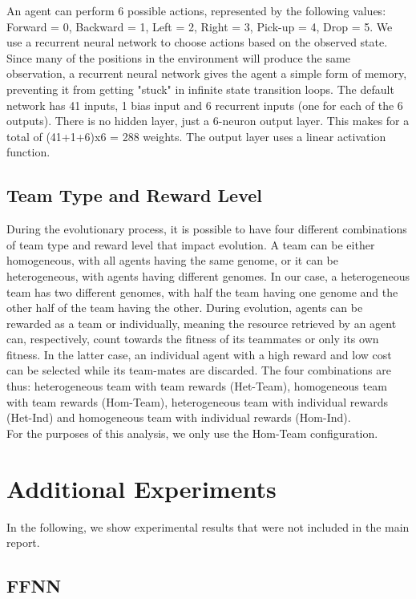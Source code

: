 \documentclass[12pt]{article}
\begin{document}
\begin{appendices}
An agent can perform 6 possible actions, represented by the following values: Forward = 0, Backward = 1, Left = 2, Right = 3, Pick-up = 4, Drop = 5.
We use a recurrent neural network to choose actions based on the observed state.
Since many of the positions in the environment will produce the same observation, a recurrent neural network gives the agent a simple form of memory, preventing it from getting "stuck" in infinite state transition loops.
The default network has 41 inputs, 1 bias input and 6 recurrent inputs (one for each of the 6 outputs). 
There is no hidden layer, just a 6-neuron output layer. 
This makes for a total of (41+1+6)x6 = 288 weights. 
The output layer uses a linear activation function.

\subsection{Team Type and Reward Level}\label{rewards}

During the evolutionary process, it is possible to have four different combinations of team type and reward level that impact evolution.
A team can be either homogeneous, with all agents having the same genome, or it can be heterogeneous, with agents having different genomes.
In our case, a heterogeneous team has two different genomes, with half the team having one genome and the other half of the team having the other.
During evolution, agents can be rewarded as a team or individually, meaning the resource retrieved by an agent can, respectively, count towards the fitness of its teammates or only its own fitness.
In the latter case, an individual agent with a high reward and low cost can be selected while its team-mates are discarded. 
The four combinations are thus: heterogeneous team with team rewards (Het-Team), homogeneous team with team rewards (Hom-Team), heterogeneous team with individual rewards (Het-Ind) and homogeneous team with individual rewards (Hom-Ind).\\

For the purposes of this analysis, we only use the Hom-Team configuration.

\section{Additional Experiments}

In the following, we show experimental results that were not included in the main report.

\subsection{FFNN}\label{FFNN}


\end{appendices}
\end{document}
